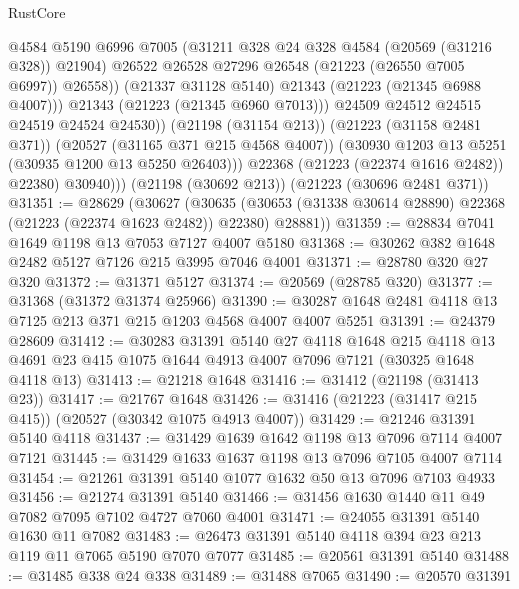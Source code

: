 \begin{lexlean}{RustCore}
\begin{coremodule}
                          @4584
                          @5190
                          @6996
                          @7005
                          (@31211 @328 @24 @328 @4584 (@20569 (@31216 @328)) @21904)
                          @26522
                          @26528
                          @27296
                          @26548
                          (@21223 (@26550 @7005 @6997))
                          @26558))
                      (@21337 @31128 @5140)
                      @21343
                      (@21223 (@21345 @6988 @4007)))
                    @21343
                    (@21223 (@21345 @6960 @7013)))
                  @24509
                  @24512
                  @24515
                  @24519
                  @24524
                  @24530))
              (@21198 (@31154 @213))
              (@21223 (@31158 @2481 @371))
              (@20527 (@31165 @371 @215 @4568 @4007))
              (@30930 @1203 @13 @5251 (@30935 @1200 @13 @5250 @26403)))
            @22368
            (@21223 (@22374 @1616 @2482))
            @22380)
          @30940)))
    (@21198 (@30692 @213))
    (@21223 (@30696 @2481 @371))
@31351 := @28629
    (@30627
      (@30635 (@30653 (@31338 @30614 @28890) @22368 (@21223 (@22374 @1623 @2482)) @22380) @28881))
@31359 := @28834 @7041 @1649 @1198 @13 @7053 @7127 @4007 @5180
@31368 := @30262 @382 @1648 @2482 @5127 @7126 @215 @3995 @7046 @4001
@31371 := @28780 @320 @27 @320
@31372 := @31371 @5127
@31374 := @20569 (@28785 @320)
@31377 := @31368 (@31372 @31374 @25966)
@31390 := @30287 @1648 @2481 @4118 @13 @7125 @213 @371 @215 @1203 @4568 @4007 @4007 @5251
@31391 := @24379 @28609
@31412 := @30283
    @31391
    @5140
    @27
    @4118
    @1648
    @215
    @4118
    @13
    @4691
    @23
    @415
    @1075
    @1644
    @4913
    @4007
    @7096
    @7121
    (@30325 @1648 @4118 @13)
@31413 := @21218 @1648
@31416 := @31412 (@21198 (@31413 @23))
@31417 := @21767 @1648
@31426 := @31416 (@21223 (@31417 @215 @415)) (@20527 (@30342 @1075 @4913 @4007))
@31429 := @21246 @31391 @5140 @4118
@31437 := @31429 @1639 @1642 @1198 @13 @7096 @7114 @4007 @7121
@31445 := @31429 @1633 @1637 @1198 @13 @7096 @7105 @4007 @7114
@31454 := @21261 @31391 @5140 @1077 @1632 @50 @13 @7096 @7103 @4933
@31456 := @21274 @31391 @5140
@31466 := @31456 @1630 @1440 @11 @49 @7082 @7095 @7102 @4727 @7060 @4001
@31471 := @24055 @31391 @5140 @1630 @11 @7082
@31483 := @26473 @31391 @5140 @4118 @394 @23 @213 @119 @11 @7065 @5190 @7070 @7077
@31485 := @20561 @31391 @5140
@31488 := @31485 @338 @24 @338
@31489 := @31488 @7065
@31490 := @20570 @31391

\end{coremodule}
\end{lexlean}
